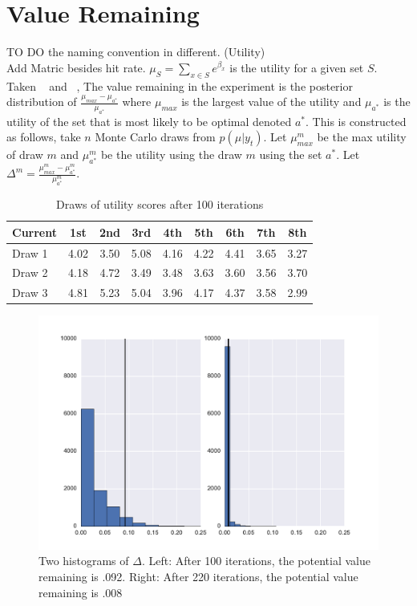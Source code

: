\documentclass[12pt]{article}
\begin{document}
\section{Value Remaining}TO DO the naming convention in different. (Utility)\\
Add Matric besides hit rate.
$\mu_{S}=\sum_{x \in S} e^{\beta_{x}}$ is the utility for a given set $S$.\\
Taken ~\cite{scott2015multi} and ~\cite{scott2010modern}, The value remaining in the experiment is the posterior distribution of $\frac{\mu_{max}-\mu_{a^*}}{\mu_{a^*}}$ where $\mu_{max}$ is the largest value of the utility and $\mu_{a^*}$ is the utility of the set that is most likely to be optimal denoted $a^*$. This is constructed as follows, take $n$ Monte Carlo draws from $p(\mu|y_t)$. Let $\mu_{max}^{m}$ be the max utility of draw $m$ and $\mu_{a^*}^{m}$ be the utility using the draw $m$ using the set $a^*$. Let $\Delta^{m}=\frac{\mu^m_{max}-\mu^m_{a^*}}{\mu^m_{a^*}}$.\\
\begin{table}
\begin{center}
\begin{tabular}{l | c c c c c c c c}
Current & 1st &  2nd  &  3rd  &  4th &  5th & 6th & 7th &  8th \\
\hline
Draw 1 & 4.02 &  3.50 &  5.08 & 4.16&  4.22 & 4.41 & 3.65 &  3.27 \\
Draw 2 &4.18 & 4.72 & 3.49 & 3.48 & 3.63 & 3.60 & 3.56 &  3.70 \\
Draw 3 &4.81 & 5.23 & 5.04 &  3.96 &  4.17 & 4.37 &  3.58 & 2.99 \\ 
\end{tabular}
\end{center}
\caption{Draws of utility scores after 100 iterations}
\label{table:data}
\end{table}

\begin{figure}
\includegraphics[width=1\linewidth]{valremhist.pdf}
\caption{Two histograms of $\Delta$. Left: After 100 iterations, the potential value remaining is .092. Right: After 220 iterations, the potential value remaining is .008}
\label{fig:data}
\end{figure}
\end{document}
